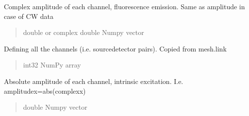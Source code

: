 \documentclass[letterpaper,10pt,english]{sphinxmanual}
\begin{document}
\begin{fulllineitems}
\begin{fulllineitems}
\begin{quote}
\begin{description}
\end{description}\end{quote}

\end{fulllineitems}


\begin{fulllineitems}
\label{\detokenize{_autosummary/nirfasterff.base.data.FLdata:nirfasterff.base.data.FLdata.complexfl}}
\pysigstartsignatures
\pysigline
{}
\pysigstopsignatures
\sphinxAtStartPar
Complex amplitude of each channel, fluorescence emission. Same as amplitude in case of CW data
\begin{quote}\begin{description}
\sphinxAtStartPar
double or complex double Numpy vector

\end{description}\end{quote}

\end{fulllineitems}


\begin{fulllineitems}
\label{\detokenize{_autosummary/nirfasterff.base.data.FLdata:nirfasterff.base.data.FLdata.link}}
\pysigstartsignatures
\pysigline
{}
\pysigstopsignatures
\sphinxAtStartPar
Defining all the channels (i.e. source\sphinxhyphen{}detector pairs). Copied from mesh.link
\begin{quote}\begin{description}
\sphinxAtStartPar
int32 NumPy array

\end{description}\end{quote}

\end{fulllineitems}


\begin{fulllineitems}
\label{\detokenize{_autosummary/nirfasterff.base.data.FLdata:nirfasterff.base.data.FLdata.amplitudex}}
\pysigstartsignatures
\pysigline
{}
\pysigstopsignatures
\sphinxAtStartPar
Absolute amplitude of each channel, intrinsic excitation. I.e. amplitudex=abs(complexx)
\begin{quote}\begin{description}
\sphinxAtStartPar
double Numpy vector


\end{description}
\end{quote}
\end{fulllineitems}
\end{fulllineitems}
\end{document}
